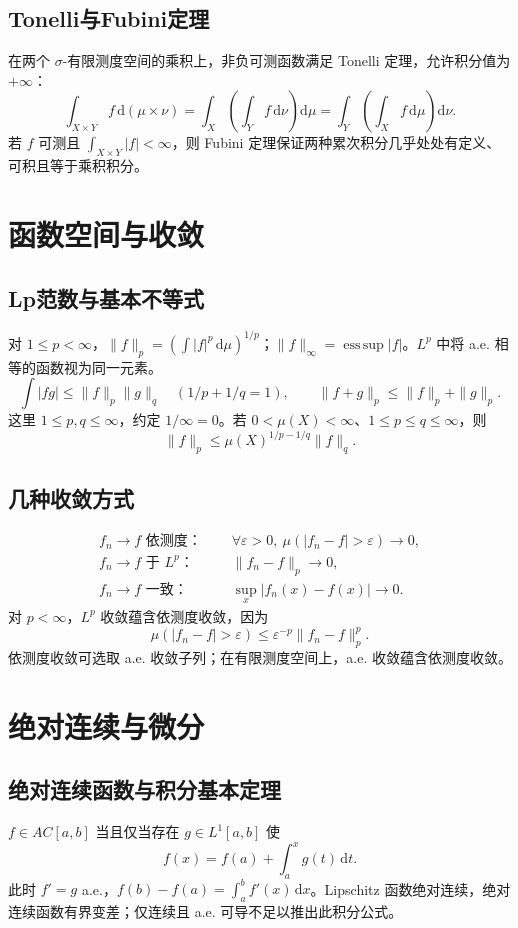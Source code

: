 \documentclass[../main.tex]{subfiles}
\begin{document}
\subsection{Tonelli与Fubini定理}
在两个 $\sigma$-有限测度空间的乘积上，非负可测函数满足 Tonelli 定理，允许积分值为 $+\infty$：
\[
\int_{X\times Y}f\,\mathrm d(\mu\times\nu)
=\int_X\!\left(\int_Yf\,\mathrm d\nu\right)\mathrm d\mu
=\int_Y\!\left(\int_Xf\,\mathrm d\mu\right)\mathrm d\nu.
\]
若 $f$ 可测且 $\int_{X\times Y}|f|<\infty$，则 Fubini 定理保证两种累次积分几乎处处有定义、可积且等于乘积积分。
\section{函数空间与收敛}
\subsection{Lp范数与基本不等式}
对 $1\le p<\infty$，$\|f\|_p=(\int|f|^p\,\mathrm d\mu)^{1/p}$；$\|f\|_\infty=\operatorname*{ess\,sup}|f|$。$L^p$ 中将 a.e. 相等的函数视为同一元素。
\[
\int|fg|\le\|f\|_p\|g\|_q\quad(1/p+1/q=1),\qquad
\|f+g\|_p\le\|f\|_p+\|g\|_p.
\]
这里 $1\le p,q\le\infty$，约定 $1/\infty=0$。若 $0<\mu(X)<\infty$、$1\le p\le q\le\infty$，则
\[
\|f\|_p\le\mu(X)^{1/p-1/q}\|f\|_q.
\]
\subsection{几种收敛方式}
\begin{align*}
f_n\to f\text{ 依测度： }&\quad\forall\varepsilon>0,\ \mu(|f_n-f|>\varepsilon)\to0,\\
f_n\to f\text{ 于 }L^p\text{：}&\quad\|f_n-f\|_p\to0,\\
f_n\to f\text{ 一致： }&\quad\sup_x|f_n(x)-f(x)|\to0.
\end{align*}
对 $p<\infty$，$L^p$ 收敛蕴含依测度收敛，因为
\[
\mu(|f_n-f|>\varepsilon)\le\varepsilon^{-p}\|f_n-f\|_p^p.
\]
依测度收敛可选取 a.e. 收敛子列；在有限测度空间上，a.e. 收敛蕴含依测度收敛。
\section{绝对连续与微分}
\subsection{绝对连续函数与积分基本定理}
$f\in AC[a,b]$ 当且仅当存在 $g\in L^1[a,b]$ 使
\[
f(x)=f(a)+\int_a^xg(t)\,\mathrm dt.
\]
此时 $f'=g$ a.e.，$f(b)-f(a)=\int_a^bf'(x)\,\mathrm dx$。Lipschitz 函数绝对连续，绝对连续函数有界变差；仅连续且 a.e. 可导不足以推出此积分公式。
\end{document}
